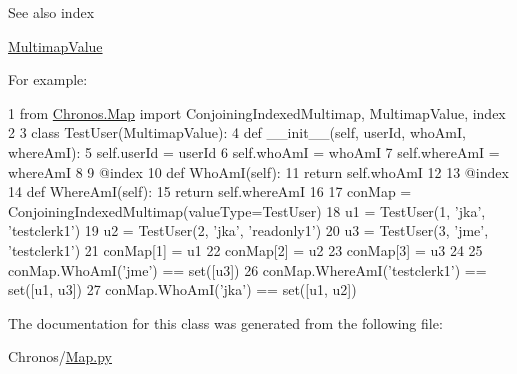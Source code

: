 \begin{DoxySeeAlso}{See also}
index 

\hyperlink{classChronos_1_1Map_1_1MultimapValue}{Multimap\+Value}
\end{DoxySeeAlso}
For example\+: 
\begin{DoxyCode}
1 \textcolor{keyword}{from} \hyperlink{namespaceChronos_1_1Map}{Chronos.Map} \textcolor{keyword}{import} ConjoiningIndexedMultimap, MultimapValue, index
2 
3 \textcolor{keyword}{class }TestUser(MultimapValue):
4     \textcolor{keyword}{def }\_\_init\_\_(self, userId, whoAmI, whereAmI):
5         self.userId = userId
6         self.whoAmI = whoAmI
7         self.whereAmI = whereAmI
8 
9     @index
10     \textcolor{keyword}{def }WhoAmI(self):
11         \textcolor{keywordflow}{return} self.whoAmI
12 
13     @index
14     \textcolor{keyword}{def }WhereAmI(self):
15         \textcolor{keywordflow}{return} self.whereAmI
16 
17 conMap = ConjoiningIndexedMultimap(valueType=TestUser)
18 u1 = TestUser(1, \textcolor{stringliteral}{'jka'}, \textcolor{stringliteral}{'testclerk1'})
19 u2 = TestUser(2, \textcolor{stringliteral}{'jka'}, \textcolor{stringliteral}{'readonly1'})
20 u3 = TestUser(3, \textcolor{stringliteral}{'jme'}, \textcolor{stringliteral}{'testclerk1'})
21 conMap[1] = u1
22 conMap[2] = u2
23 conMap[3] = u3
24 
25 conMap.WhoAmI(\textcolor{stringliteral}{'jme'}) == set([u3])
26 conMap.WhereAmI(\textcolor{stringliteral}{'testclerk1'}) == set([u1, u3])
27 conMap.WhoAmI(\textcolor{stringliteral}{'jka'}) == set([u1, u2])
\end{DoxyCode}
 

The documentation for this class was generated from the following file\+:\begin{DoxyCompactItemize}
\item 
Chronos/\hyperlink{Map_8py}{Map.\+py}\end{DoxyCompactItemize}

